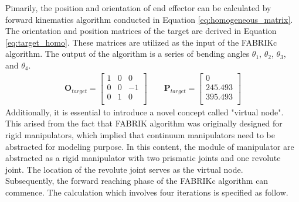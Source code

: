 Pimarily, the position and orientation of end effector can be calculated by forward kinematics algorithm conducted 
in Equation \ref{eq:homogeneous_matrix}. The orientation and position matrices of the target are derived in Equation 
\ref{eq:target_homo}. These matrices are utilized as the input of the FABRIKc algorithm. The output of the algorithm 
is a series of bending angles $\theta_1$, $\theta_2$, $\theta_3$, and $\theta_4$.
\begin{align}
    \textbf{O}_{target} = 
    \begin{bmatrix}
        1 & 0 & 0 \\
        0 & 0 & -1 \\
        0 & 1 & 0 \\
    \end{bmatrix} 
    \qquad
    \textbf{P}_{target} = 
    \begin{bmatrix}
        0 \\
        245.493 \\
        395.493 \\
    \end{bmatrix} 
    \label{eq:target_homo} 
\end{align}
Additionally, it is essential to introduce a novel concept called "virtual node". This arised from the fact that FABRIK 
algorithm was originally designed for rigid manipulators, which implied that continuum manipulators need to be abstracted 
for modeling purpose. In this content, the module of manipulator are abstracted as a rigid manipulator with two prismatic 
joints and one revolute joint. The location of the revolute joint serves as the virtual node. \\
Subsequently, the forward reaching phase of the FABRIKc algorithm can commence. The calculation which involves four 
iterations is specified as follow.
